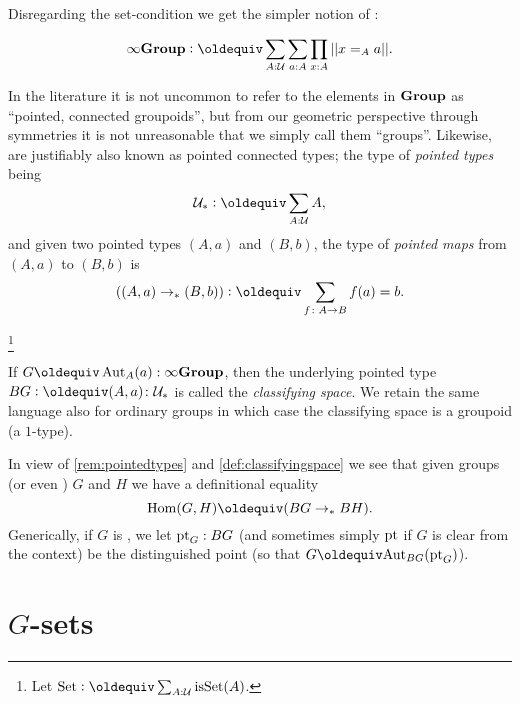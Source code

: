\section{\inftygps}
\label{sec:inftygps}

Disregarding the set-condition we get the simpler notion of \inftygps:
\begin{definition}
  $$\typeinftygp\defequi \sum_{A:\UU}\sum_{a:A}\prod_{x:A}||x=_Aa||.$$
\end{definition}

\begin{remark}\label{rem:pointedtypes}
  In the literature it is not uncommon to refer to the elements in $\mathbf{Group}$ as ``pointed, connected groupoids'', but from our geometric perspective through symmetries it is not unreasonable that we simply call them ``groups''.  Likewise, \inftygps are justifiably also known as pointed connected types;  the type of \emph{pointed types} being
$$\pttype\defequi\sum_{A:\UU}A,$$
and given two pointed types $(A,a)$ and $(B,b)$, the type of \emph{pointed maps} from $(A,a)$ to $(B,b)$ is
$$((A,a)\to_*(B,b))\defequi\sum_{f\colon A\to B}f(a)=b.$$
\end{remark}


\footnote{Let $\typeset\defequi \sum_{A:\UU}\isset(A)$.}
\begin{definition}\label{def:classifyingspace}
  If $G\oldequiv\Aut_A(a):\typeinftygp$, then the underlying pointed type $BG\defequi (A,a)\colon\pttype$ is called the  \emph{classifying space}.  We retain the same language also for ordinary groups in which case the classifying space is a groupoid (\ie a $1$-type).   %
\end{definition}
\begin{remark}
  In view of \cref{rem:pointedtypes} and \cref{def:classifyingspace} we see that given groups (or even \inftygps) $G$ and $H$ we have a definitional equality
$$\Hom(G,H)\oldequiv(BG\to_*BH).$$
Generically, if $G$ is \aninftygp, we let ${\mathord{\mathrm{pt}}}_G:BG$ (and sometimes simply ${\mathord{\mathrm{pt}}}$ if $G$ is clear from the context) be the distinguished point (so that $G\oldequiv\aut_{BG}(\pt_G)$).
\end{remark}





\section{$G$-sets}
\label{sec:gsets}


